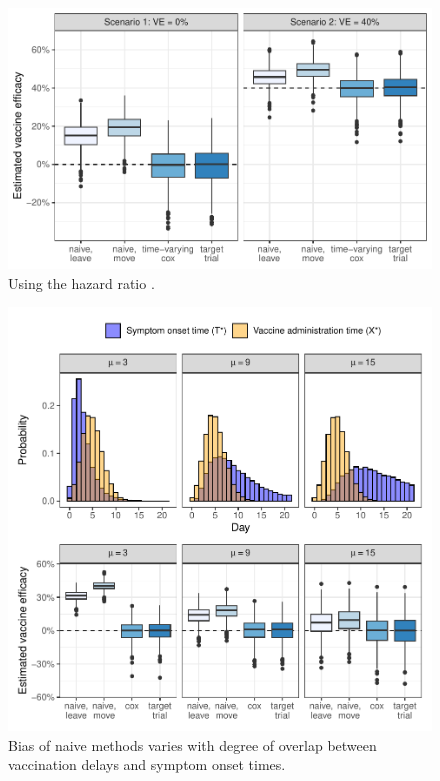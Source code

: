 \begin{appendix}
    \begin{figure}[p]
        \centering
        \includegraphics{../3_figures/sim_hr.pdf}
        \caption{Using the hazard ratio .\label{fig:sim_hr}}
    \end{figure}

    \begin{figure}[p]
        \centering
        \includegraphics{../3_figures/sim_overlap.pdf}
        \caption{Bias of naive methods varies with degree of overlap between vaccination delays and symptom onset times.\label{fig:sim_overlap}}
    \end{figure}


\end{appendix}
